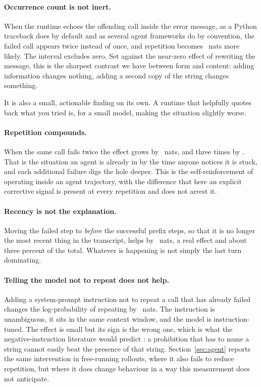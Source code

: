 \paragraph{Occurrence count is not inert.}
When the runtime echoes the offending call inside the error message, as a
Python traceback does by default and as several agent frameworks do by
convention, the failed call appears twice instead of once, and repetition
becomes \DEchoCI\ nats more likely. The interval excludes zero. Set against
the near-zero effect of rewriting the message, this is the sharpest contrast we
have between form and content: adding information changes nothing, adding a
second copy of the string changes something.

It is also a small, actionable finding on its own. A runtime that helpfully
quotes back what you tried is, for a small model, making the situation slightly
worse.

\paragraph{Repetition compounds.}
When the same call fails twice the effect grows by \DTwiceCI\ nats, and three
times by \DThriceCI. That is the situation an agent is already in by the time
anyone notices it is stuck, and each additional failure digs the hole deeper.
This is the self-reinforcement of \citet{xu2022breaktheloop} operating inside an
agent trajectory, with the difference that here an explicit corrective signal is
present at every repetition and does not arrest it.

\paragraph{Recency is not the explanation.}
Moving the failed step to \emph{before} the successful prefix steps, so that it
is no longer the most recent thing in the transcript, helps by \DEarlyCI\ nats, a real effect and about three percent of the
total. Whatever is happening
is not simply the last turn dominating.

\paragraph{Telling the model not to repeat does not help.}
Adding a system-prompt instruction not to repeat a call that has already failed
changes the log-probability of repeating by \DInstructionCI\ nats. The
instruction is unambiguous, it sits in the same context window, and the model is
instruction-tuned. The effect is small but its sign is the wrong one, which is
what the negative-instruction literature would predict
\citep{castricato2024pinkelephants,negation2025pinkelephant}: a prohibition that
has to name a string cannot easily beat the presence of that string.
Section~\ref{sec:agent} reports the same intervention in free-running rollouts,
where it also fails to reduce repetition, but where it does change behaviour
in a way this measurement does not anticipate.

